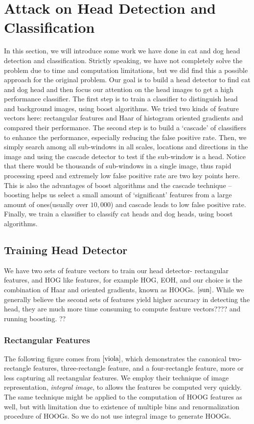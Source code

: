 \documentclass[12pt]{article}
\begin{document}
\section{Attack on Head Detection and Classification}
In this section, we will introduce some work we have done in cat and dog head detection and classification. Strictly speaking, we have not completely solve the problem due to time and computation limitations, but we did find this a possible approach for the original problem. Our goal is to build a head detector to find cat and dog head and then focus our attention on the head images to get a high performance classifier. The first step is to train a classifier to distinguish head and background images, using boost algorithms. We tried two kinds of feature vectors here: rectangular features and Haar of histogram oriented gradients and compared their performance. The second step is to build a `cascade' of classifiers to enhance the performance, especially reducing the false positive rate. Then, we simply search among all sub-windows in all scales, locations and directions in the image and using the cascade detector to test if the sub-window is a head. Notice that there would be thousands of sub-windows in a single image, thus rapid processing speed and extremely low false positive rate are two key points here. This is also the advantages of boost algorithms and the cascade technique -- boosting helps us select a small amount of `significant' features from a large amount of ones(usually over $10,000$) and cascade leads to low false positive rate. Finally, we train a classifier to classify cat heads and dog heads, using boost algorithms.


\subsection{Training Head Detector}
We have two sets of feature vectors to train our head detector- rectangular features, and HOG like features, for example HOG, EOH, and our choice is the combination of Haar and oriented gradients, known as HOOGs. $\cite{sun}$. While we generally believe the second sets of features yield higher accuracy in detecting the head, they are much more time consuming to compute feature vectors???? and running boosting. ??
  
\subsubsection{Rectangular Features}
The following figure comes from $\cite{viola}$, which demonstrates the canonical two-rectangle features, three-rectangle feature, and a four-rectangle feature, more or less capturing all rectangular features. We employ their technique of image representation, \textit{integral image}, to allows the features be computed very quickly. The same technique might be applied to the computation of HOOG features as well, but with limitation due to existence of multiple bins and renormalization procedure of HOOGs. So we do not use integral image to generate HOOGs.
\end{document}
